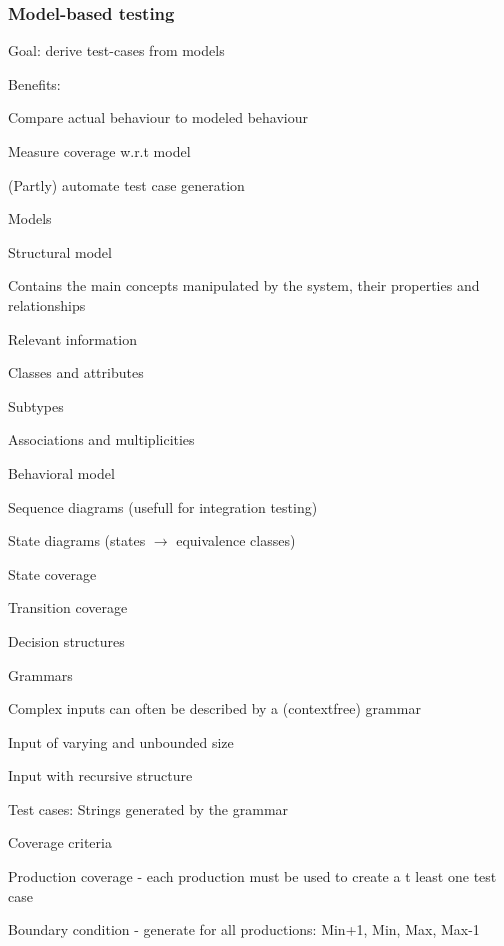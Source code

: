 \subsubsection{Model-based testing}
\enumstart
	\item Goal: derive test-cases from models
	\item Benefits:
	\enumstart
		\item Compare actual behaviour to modeled behaviour
		\item Measure coverage w.r.t model
		\item (Partly) automate test case generation
	\enumend
	\item Models
	\enumstart
		\item Structural model
		\enumstart
			\item Contains the main concepts manipulated by the system, their properties and relationships
			\item Relevant information
			\enumstart
				\item Classes and attributes
				\item Subtypes
				\item Associations and multiplicities
			\enumend
		\enumend
		\item Behavioral model
		\enumstart
			\item Sequence diagrams (usefull for integration testing)
			\item State diagrams (states $\rightarrow$ equivalence classes)
			\enumstart
				\item State coverage
				\item Transition coverage
			\enumend
		\enumend
		\item Decision structures
		\item Grammars
		\enumstart
			\item Complex inputs can often be described by a (contextfree) grammar
			\item Input of varying and unbounded size
			\item Input with recursive structure
			\item Test cases: Strings generated by the grammar
			\item Coverage criteria
			\enumstart
				\item Production coverage - each production must be used to create a t least one test case
				\item Boundary condition - generate for all productions: Min+1, Min, Max, Max-1
			\enumend
		\enumend
	\enumend
\enumend


